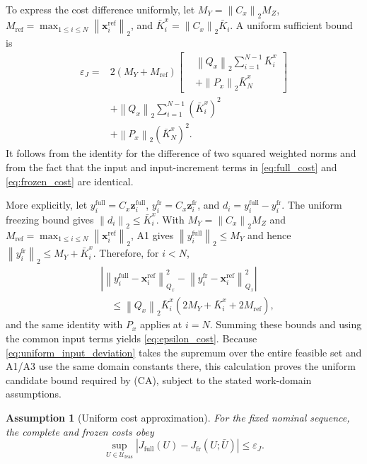﻿\documentclass[journal]{IEEEtran}
\newtheorem{assumption}{Assumption}
\newcommand{\vx}{\mathbf{x}}
\newcommand{\vz}{\mathbf{z}}
\newcommand{\norm}[1]{\left\lVert #1\right\rVert}
\begin{document}
To express the cost difference uniformly, let $M_Y=\norm{C_x}_2M_Z$, $M_{\mathrm{ref}}=\max_{1\le i\le N}\norm{\vx_i^{\mathrm{ref}}}_2$, and $\bar K_i^x=\norm{C_x}_2\bar K_i$. A uniform sufficient bound is
\begin{equation}
\begin{aligned}
\varepsilon_J={}&2(M_Y+M_{\mathrm{ref}})
 \left[\begin{aligned}
 &\norm{Q_x}_2\sum_{i=1}^{N-1}\bar K_i^x\\
 &+\norm{P_x}_2\bar K_N^x
 \end{aligned}\right]\\
&+\norm{Q_x}_2\sum_{i=1}^{N-1}(\bar K_i^x)^2\\
&+\norm{P_x}_2(\bar K_N^x)^2.
\end{aligned}
\label{eq:epsilon_cost}
\end{equation}
It follows from the identity for the difference of two squared weighted norms and from the fact that the input and input-increment terms in \eqref{eq:full_cost} and \eqref{eq:frozen_cost} are identical.

More explicitly, let $y_i^{\mathrm{full}}=C_x\vz_i^{\mathrm{full}}$, $y_i^{\mathrm{fr}}=C_x\vz_i^{\mathrm{fr}}$, and $d_i=y_i^{\mathrm{full}}-y_i^{\mathrm{fr}}$. The uniform freezing bound gives $\norm{d_i}_2\le\bar K_i^x$. With $M_Y=\norm{C_x}_2M_Z$ and $M_{\mathrm{ref}}=\max_{1\le i\le N}\norm{\vx_i^{\mathrm{ref}}}_2$, A1 gives $\norm{y_i^{\mathrm{full}}}_2\le M_Y$ and hence $\norm{y_i^{\mathrm{fr}}}_2\le M_Y+\bar K_i^x$. Therefore, for $i<N$,
\begin{equation}
\begin{aligned}
&\left|\norm{y_i^{\mathrm{full}}-\vx_i^{\mathrm{ref}}}_{Q_x}^2-
\norm{y_i^{\mathrm{fr}}-\vx_i^{\mathrm{ref}}}_{Q_x}^2\right|\\
&\quad\le\norm{Q_x}_2\bar K_i^x(2M_Y+\bar K_i^x+2M_{\mathrm{ref}}),
\end{aligned}
\end{equation}
and the same identity with $P_x$ applies at $i=N$. Summing these bounds and using the common input terms yields \eqref{eq:epsilon_cost}. Because \eqref{eq:uniform_input_deviation} takes the supremum over the entire feasible set and A1/A3 use the same domain constants there, this calculation proves the uniform candidate bound required by (CA), subject to the stated work-domain assumptions.

\begin{assumption}[Uniform cost approximation]
\label{ass:cost_approximation}
For the fixed nominal sequence, the complete and frozen costs obey
\begin{equation}
    \sup_{U\in\mathcal U_{\mathrm{feas}}}
    |J_{\mathrm{full}}(U)-J_{\mathrm{fr}}(U;\bar U)|\le\varepsilon_J.
\end{equation}
\end{assumption}
\end{document}
